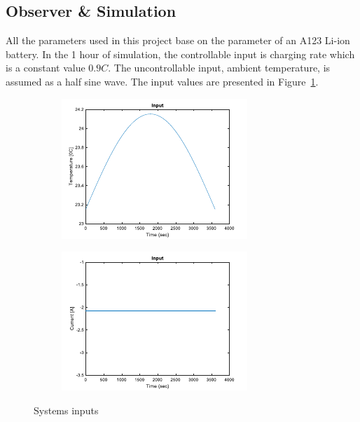 \documentclass[12pt]{article}
\begin{document}
\subsection{Observer \& Simulation}
All the parameters used in this project base on the parameter of an A123 Li-ion battery. In the 1 hour of simulation, the controllable input is charging rate which is a constant value $0.9 C$. The uncontrollable input, ambient temperature, is assumed as a half sine wave. The input values are presented in Figure~\ref{fig:sysInput}.
\begin{figure}[H]
	\centering
	\begin{subfigure}[t]{0.45\linewidth}
		\includegraphics[width=\linewidth]{figures/sysinput1.pdf}
	\end{subfigure}
	\begin{subfigure}[t]{0.45\linewidth}
		\includegraphics[width=\linewidth]{figures/sysinput2.pdf}
	\end{subfigure}	
	\caption{Systems inputs}\label{fig:sysInput}
\end{figure}
\end{document}
